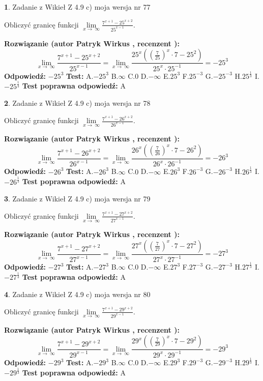 \documentclass[12pt, a4paper]{article}
\theoremstyle{definition} %
\newtheorem{zad}{}
\newcommand{\zadStart}[1]{\begin{zad}#1\newline}
\newcommand{\zadStop}{\end{zad}}
\newcommand{\rozwStart}[2]{\noindent \textbf{Rozwiązanie (autor #1 , recenzent #2): }\newline}
\newcommand{\rozwStop}{\newline}
\newcommand{\odpStart}{\noindent \textbf{Odpowiedź:}\newline}
\newcommand{\odpStop}{\newline}
\newcommand{\testStart}{\noindent \textbf{Test:}\newline}
\newcommand{\testStop}{\newline}
\newcommand{\kluczStart}{\noindent \textbf{Test poprawna odpowiedź:}\newline}
\newcommand{\kluczStop}{\newline}
\begin{document}
\zadStart{Zadanie z Wikieł Z 4.9 c) moja wersja nr 77}


Obliczyć granicę funkcji  $\lim\limits_{x\to\ \infty}\frac{7^{x+1}-25^{x+2}}{25^{x-1}}$.
\zadStop
\rozwStart{Patryk Wirkus}{}
$$\lim\limits_{x\to\ \infty}\frac{7^{x+1}-25^{x+2}}{25^{x-1}}=\lim\limits_{x\to\ \infty}\frac{25^{x}((\frac{7}{25})^{x}\cdot 7 -25^{2})}{25^{x}\cdot 25^{-1}} = -25^{3}$$
\rozwStop
\odpStart
$-25^{3}$
\odpStop
\testStart
A.$-25^{3}$ B.$\infty$ C.$0$ D.$-\infty$ E.$25^{3}$
F.$25^{-3}$ G.$-25^{-3}$
H.$25^{\frac{1}{3}}$
I.$-25^{\frac{1}{3}}$
\testStop
\kluczStart
A
\kluczStop



\zadStart{Zadanie z Wikieł Z 4.9 c) moja wersja nr 78}


Obliczyć granicę funkcji  $\lim\limits_{x\to\ \infty}\frac{7^{x+1}-26^{x+2}}{26^{x-1}}$.
\zadStop
\rozwStart{Patryk Wirkus}{}
$$\lim\limits_{x\to\ \infty}\frac{7^{x+1}-26^{x+2}}{26^{x-1}}=\lim\limits_{x\to\ \infty}\frac{26^{x}((\frac{7}{26})^{x}\cdot 7 -26^{2})}{26^{x}\cdot 26^{-1}} = -26^{3}$$
\rozwStop
\odpStart
$-26^{3}$
\odpStop
\testStart
A.$-26^{3}$ B.$\infty$ C.$0$ D.$-\infty$ E.$26^{3}$
F.$26^{-3}$ G.$-26^{-3}$
H.$26^{\frac{1}{3}}$
I.$-26^{\frac{1}{3}}$
\testStop
\kluczStart
A
\kluczStop



\zadStart{Zadanie z Wikieł Z 4.9 c) moja wersja nr 79}


Obliczyć granicę funkcji  $\lim\limits_{x\to\ \infty}\frac{7^{x+1}-27^{x+2}}{27^{x-1}}$.
\zadStop
\rozwStart{Patryk Wirkus}{}
$$\lim\limits_{x\to\ \infty}\frac{7^{x+1}-27^{x+2}}{27^{x-1}}=\lim\limits_{x\to\ \infty}\frac{27^{x}((\frac{7}{27})^{x}\cdot 7 -27^{2})}{27^{x}\cdot 27^{-1}} = -27^{3}$$
\rozwStop
\odpStart
$-27^{3}$
\odpStop
\testStart
A.$-27^{3}$ B.$\infty$ C.$0$ D.$-\infty$ E.$27^{3}$
F.$27^{-3}$ G.$-27^{-3}$
H.$27^{\frac{1}{3}}$
I.$-27^{\frac{1}{3}}$
\testStop
\kluczStart
A
\kluczStop



\zadStart{Zadanie z Wikieł Z 4.9 c) moja wersja nr 80}


Obliczyć granicę funkcji  $\lim\limits_{x\to\ \infty}\frac{7^{x+1}-29^{x+2}}{29^{x-1}}$.
\zadStop
\rozwStart{Patryk Wirkus}{}
$$\lim\limits_{x\to\ \infty}\frac{7^{x+1}-29^{x+2}}{29^{x-1}}=\lim\limits_{x\to\ \infty}\frac{29^{x}((\frac{7}{29})^{x}\cdot 7 -29^{2})}{29^{x}\cdot 29^{-1}} = -29^{3}$$
\rozwStop
\odpStart
$-29^{3}$
\odpStop
\testStart
A.$-29^{3}$ B.$\infty$ C.$0$ D.$-\infty$ E.$29^{3}$
F.$29^{-3}$ G.$-29^{-3}$
H.$29^{\frac{1}{3}}$
I.$-29^{\frac{1}{3}}$
\testStop
\kluczStart
A
\kluczStop
\end{document}
